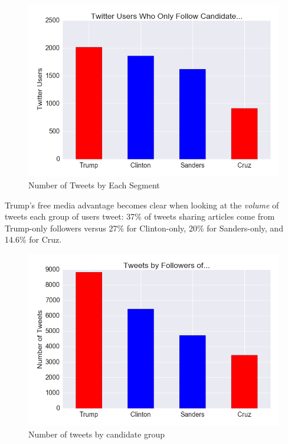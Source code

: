 \documentclass[letterpaper]{article}
\begin{document}
\begin{figure}[t!]  
\centering 
  \includegraphics[width=\columnwidth]{users-by-candid}  
  \caption{Number of Tweets by Each Segment
    \label{fig:users-by-candid}}
\end{figure} 

 

Trump's free media advantage becomes clear when looking at the \emph{volume} of tweets each group of users tweet: 37\% of tweets sharing articles come from Trump-only followers versus 27\% for Clinton-only, 20\% for Sanders-only, and 14.6\% for Cruz.

\begin{figure}[t!]  
\centering 
  \includegraphics[width=\columnwidth]{tweets-by-candid}  
  \caption{Number of tweets by candidate group
    \label{fig:tweets-by-candid}}
\end{figure} 
\end{document}
